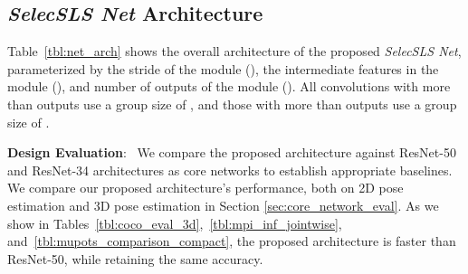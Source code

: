 \documentclass[acmtog,authorversion]{acmart}
\newcommand{\parahead}[1]{\textbf{#1}:\ }
\begin{document}
\subsection{\textit{SelecSLS Net} Architecture}
\label{sec:dlnas_net}
Table~\ref{tbl:net_arch} shows the overall architecture of the proposed \textit{SelecSLS Net}, parameterized by the stride of the module (), the intermediate features in the module (), and number of outputs of the module (). 
All  convolutions with more than  outputs use a group size of , and those with more than  outputs use a group size of .

\parahead{Design Evaluation}
We compare the proposed architecture against ResNet-50 and ResNet-34 architectures as core networks to establish appropriate baselines. We compare our proposed architecture's performance, both on 2D pose estimation and 3D pose estimation in Section \ref{sec:core_network_eval}. As we show in Tables~\ref{tbl:coco_eval_3d},~\ref{tbl:mpi_inf_jointwise}, and~\ref{tbl:mupots_comparison_compact}, the proposed architecture is  faster than ResNet-50, while retaining the same accuracy.
\end{document}
